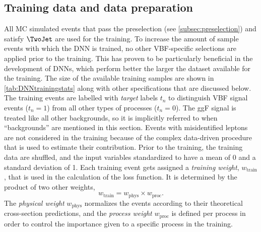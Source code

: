 

\subsection{Training data and data preparation}
\label{subsec:training-data}
All MC simulated events that pass the preselection (see \cref{subsec:preselection}) and satisfy $\TwoJet$ are used for the training. To increase the amount of sample events with which the DNN is trained, no other VBF-specific selections are applied prior to the training. This has proven to be particularly beneficial in the development of DNNs, which perform better the larger the dataset available for the training.
The size of the available training samples are shown in \cref{tab:DNNtrainingstats} along with other specifications that are discussed below.
The training events are labelled with \emph{target} labels $t_n$ to distinguish VBF signal events ($t_n = 1$) from all other types of processes ($t_n = 0$). 
The ggF signal is treated like all other backgrounds, so it is implicitly referred to when ``backgrounds'' are mentioned in this section.
Events with misidentified leptons are not considered in the training because of the complex data-driven procedure that is used to estimate their contribution.
Prior to the training, the training data are shuffled, and the input variables standardized to have a mean of 0 and a standard deviation of 1. 
Each training event gets assigned a \emph{training weight}, $w_\text{train}$, that is used in the calculation of the loss function. It is determined by the product of two other weights,
\begin{equation}
    w_\text{train} = w_\text{phys} \times w_\text{proc}.
\end{equation}
The \emph{physical weight} $w_\text{phys}$ normalizes the events according to their theoretical cross-section predictions, and the \emph{process weight} $w_\text{proc}$ is defined per process in order to control the importance given to a specific process in the training.
